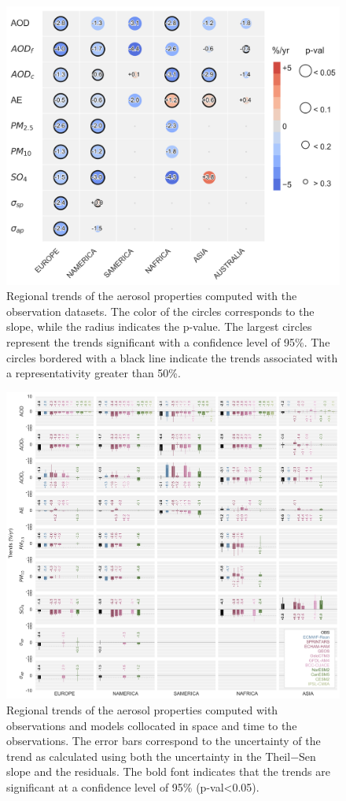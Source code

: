 \documentclass[acp, manuscript]{copernicus}
\begin{document}
\clearpage
\begin{figure}[t]
 \includegraphics[width=12cm]{../scripts/figs/heatmaps/OBS.png}
 \caption{Regional trends of the aerosol properties computed with the observation datasets. The color of the circles corresponds to the slope, while the radius indicates the p-value. The largest circles represent the trends significant with a confidence level of 95\%. The circles bordered with a black line indicate the trends associated with a representativity greater than 50\%.}
 \label{fig:obs_trends}
\end{figure}

\clearpage
\begin{figure}[t]
 \includegraphics[width=16cm]{../scripts/figs/heatmaps/BARS.png}
 \caption{Regional trends of the aerosol properties computed with observations and models collocated in space and time to the observations. The error bars correspond to the uncertainty of the trend as calculated using both the uncertainty in the Theil−Sen slope and the residuals. The bold font indicates that the trends are significant at a confidence level of 95\% (p-val<0.05).}
 \label{fig:bars}
\end{figure}
\end{document}
